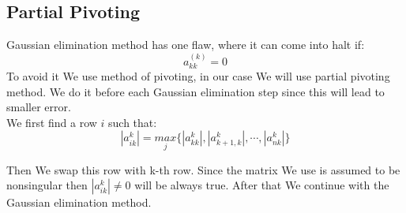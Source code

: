 \documentclass{report}
\begin{document}
\subsection{Partial Pivoting}
Gaussian elimination method has one flaw, where it can come into halt if:
\[ a_{kk}^{(k)} = 0 \]
To avoid it We use method of pivoting, in our case We will use partial pivoting method.
We do it before each Gaussian elimination step since this will lead to smaller error.
\\We first find a row $i$ such that:
\[ |{a_{ik}^{k}}| = \underset{j}{max} \{ |{a_{kk}^{k}}|, |{a_{k+1, k}^{k}}|, \cdots, |{a_{nk}^{k}}|\} \]

Then We swap this row with k-th row. Since the matrix We use is assumed to be nonsingular then $|{a_{ik}^{k}}| \neq 0$ will be always true. After that We continue with the Gaussian elimination method.
\end{document}

